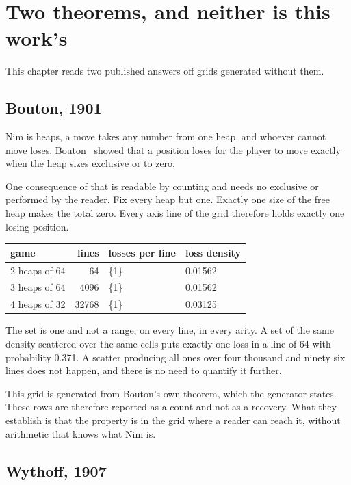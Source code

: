 \chapter{Two theorems, and neither is this work's}

This chapter reads two published answers off grids generated without them.

\section{Bouton, 1901}

Nim is heaps, a move takes any number from one heap, and whoever cannot move loses. Bouton~\cite{src:Bouton-1901} showed
that a position loses for the player to move exactly when the heap sizes exclusive or to zero.

One consequence of that is readable by counting and needs no exclusive or performed by the reader.
Fix every heap but one. Exactly one size of the free heap makes the total zero. Every axis line of the
grid therefore holds exactly one losing position.

\begin{center}
\begin{tabular}{@{}lrll@{}}
\toprule
game & lines & losses per line & loss density \\
\midrule
2 heaps of 64 & 64 & \{1\} & 0.01562 \\
3 heaps of 64 & 4096 & \{1\} & 0.01562 \\
4 heaps of 32 & 32768 & \{1\} & 0.03125 \\
\bottomrule
\end{tabular}
\end{center}

The set is one and not a range, on every line, in every arity. A set of the same density scattered
over the same cells puts exactly one loss in a line of 64 with probability 0.371. A scatter
producing all ones over four thousand and ninety six lines does not happen, and there is no need to
quantify it further.

This grid is generated from Bouton's own theorem, which the generator states. These rows are
therefore reported as a count and not as a recovery. What they establish is that the property is in
the grid where a reader can reach it, without arithmetic that knows what Nim is.

\section{Wythoff, 1907}

